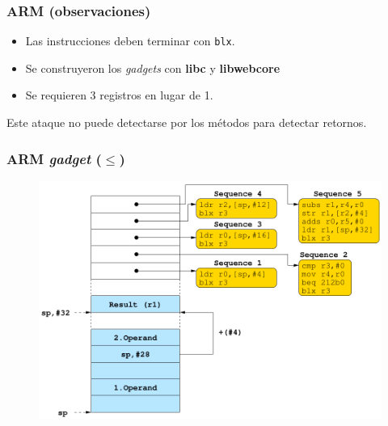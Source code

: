 \documentclass{beamer}
\begin{document}
\begin{frame}
    \frametitle{ARM (observaciones)}
    \begin{itemize}
        \item Las instrucciones deben terminar con \texttt{blx}.
        \item Se construyeron los \textit{gadgets} con \textbf{libc} y \textbf{libwebcore}
        \item Se requieren 3 registros en lugar de 1.
    \end{itemize}
    
    Este ataque no puede detectarse por los métodos para detectar retornos.
    
\end{frame}

\begin{frame}
    \frametitle{ARM \textit{gadget} ($\le$)}
    \begin{figure}
        \centering
        \includegraphics[scale=0.3]{gadgetARM.png}
    \end{figure}
\end{frame}
\end{document}
